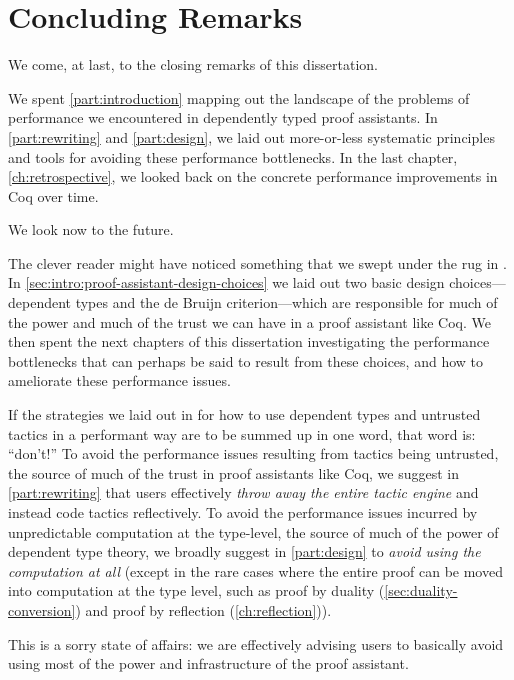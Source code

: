 \chapter{Concluding Remarks}\label{ch:conclusion}
We come, at last, to the closing remarks of this dissertation.

We spent \autoref{part:introduction} mapping out the landscape of the problems of performance we encountered in dependently typed proof assistants.
In \autoref{part:rewriting} and \autoref{part:design}, we laid out more-or-less systematic principles and tools for avoiding these performance bottlenecks.
In the last chapter, \autoref{ch:retrospective}, we looked back on the concrete performance improvements in Coq over time.

We look now to the future.

The clever reader might have noticed something that we swept under the rug in .
In \autoref{sec:intro:proof-assistant-design-choices} we laid out two basic design choices---dependent types and the de Bruijn criterion---which are responsible for much of the power and much of the trust we can have in a proof assistant like Coq.
We then spent the next chapters of this dissertation investigating the performance bottlenecks that can perhaps be said to result from these choices, and how to ameliorate these performance issues.

If the strategies we laid out in  for how to use dependent types and untrusted tactics in a performant way are to be summed up in one word, that word is: ``don't!''
To avoid the performance issues resulting from tactics being untrusted, the source of much of the trust in proof assistants like Coq, we suggest in \autoref{part:rewriting} that users effectively \emph{throw away the entire tactic engine} and instead code tactics reflectively.
To avoid the performance issues incurred by unpredictable computation at the type-level, the source of much of the power of dependent type theory, we broadly suggest in \autoref{part:design} to \emph{avoid using the computation at all} (except in the rare cases where the entire proof can be moved into computation at the type level, such as proof by duality (\autoref{sec:duality-conversion}) and proof by reflection (\autoref{ch:reflection})).

This is a sorry state of affairs:
we are effectively advising users to basically avoid using most of the power and infrastructure of the proof assistant.

